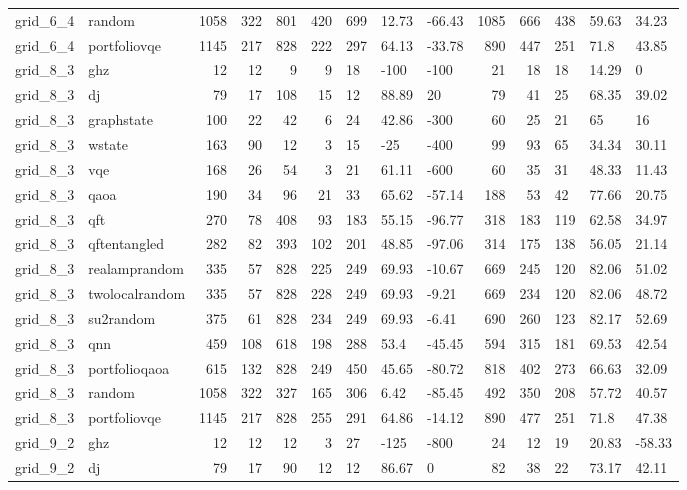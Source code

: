 \begin{longtable}{llrrrrlllrrlll}
grid\_6\_4 & random & 1058 & 322 & 801 & 420 & 699 & 12.73 & -66.43 & 1085 & 666 & 438 & 59.63 & 34.23 \\
grid\_6\_4 & portfoliovqe & 1145 & 217 & 828 & 222 & 297 & 64.13 & -33.78 & 890 & 447 & 251 & 71.8 & 43.85 \\
grid\_8\_3 & ghz & 12 & 12 & 9 & 9 & 18 & -100 & -100 & 21 & 18 & 18 & 14.29 & 0 \\
grid\_8\_3 & dj & 79 & 17 & 108 & 15 & 12 & 88.89 & 20 & 79 & 41 & 25 & 68.35 & 39.02 \\
grid\_8\_3 & graphstate & 100 & 22 & 42 & 6 & 24 & 42.86 & -300 & 60 & 25 & 21 & 65 & 16 \\
grid\_8\_3 & wstate & 163 & 90 & 12 & 3 & 15 & -25 & -400 & 99 & 93 & 65 & 34.34 & 30.11 \\
grid\_8\_3 & vqe & 168 & 26 & 54 & 3 & 21 & 61.11 & -600 & 60 & 35 & 31 & 48.33 & 11.43 \\
grid\_8\_3 & qaoa & 190 & 34 & 96 & 21 & 33 & 65.62 & -57.14 & 188 & 53 & 42 & 77.66 & 20.75 \\
grid\_8\_3 & qft & 270 & 78 & 408 & 93 & 183 & 55.15 & -96.77 & 318 & 183 & 119 & 62.58 & 34.97 \\
grid\_8\_3 & qftentangled & 282 & 82 & 393 & 102 & 201 & 48.85 & -97.06 & 314 & 175 & 138 & 56.05 & 21.14 \\
grid\_8\_3 & realamprandom & 335 & 57 & 828 & 225 & 249 & 69.93 & -10.67 & 669 & 245 & 120 & 82.06 & 51.02 \\
grid\_8\_3 & twolocalrandom & 335 & 57 & 828 & 228 & 249 & 69.93 & -9.21 & 669 & 234 & 120 & 82.06 & 48.72 \\
grid\_8\_3 & su2random & 375 & 61 & 828 & 234 & 249 & 69.93 & -6.41 & 690 & 260 & 123 & 82.17 & 52.69 \\
grid\_8\_3 & qnn & 459 & 108 & 618 & 198 & 288 & 53.4 & -45.45 & 594 & 315 & 181 & 69.53 & 42.54 \\
grid\_8\_3 & portfolioqaoa & 615 & 132 & 828 & 249 & 450 & 45.65 & -80.72 & 818 & 402 & 273 & 66.63 & 32.09 \\
grid\_8\_3 & random & 1058 & 322 & 327 & 165 & 306 & 6.42 & -85.45 & 492 & 350 & 208 & 57.72 & 40.57 \\
grid\_8\_3 & portfoliovqe & 1145 & 217 & 828 & 255 & 291 & 64.86 & -14.12 & 890 & 477 & 251 & 71.8 & 47.38 \\
grid\_9\_2 & ghz & 12 & 12 & 12 & 3 & 27 & -125 & -800 & 24 & 12 & 19 & 20.83 & -58.33 \\
grid\_9\_2 & dj & 79 & 17 & 90 & 12 & 12 & 86.67 & 0 & 82 & 38 & 22 & 73.17 & 42.11 \\

\end{longtable}
